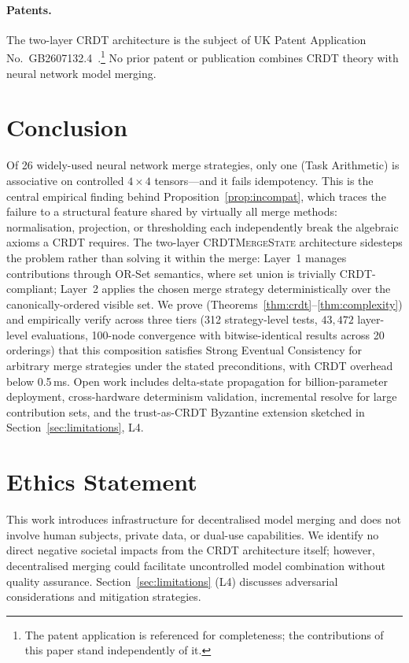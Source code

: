 \documentclass[10pt,letterpaper]{article}
\newcommand{\CMS}{\texorpdfstring{{\mdseries\upshape\textsc{CRDTMergeState}}}{CRDTMergeState}}
\begin{document}
\paragraph{Patents.}
The two-layer CRDT architecture is the subject of UK Patent Application No.\ GB2607132.4~\cite{gillespie2026patent}.\footnote{The patent application is referenced for completeness; the contributions of this paper stand independently of it.}
No prior patent or publication combines CRDT theory with neural network model merging.

\section{Conclusion}

Of 26 widely-used neural network merge strategies, only one (Task Arithmetic) is associative on controlled $4\times 4$ tensors---and it fails idempotency.
This is the central empirical finding behind Proposition~\ref{prop:incompat}, which traces the failure to a structural feature shared by virtually all merge methods: normalisation, projection, or thresholding each independently break the algebraic axioms a CRDT requires.
The two-layer \CMS{} architecture sidesteps the problem rather than solving it within the merge: Layer~1 manages contributions through OR-Set semantics, where set union is trivially CRDT-compliant; Layer~2 applies the chosen merge strategy deterministically over the canonically-ordered visible set.
We prove (Theorems~\ref{thm:crdt}--\ref{thm:complexity}) and empirically verify across three tiers (312 strategy-level tests, $43{,}472$ layer-level evaluations, 100-node convergence with bitwise-identical results across 20 orderings) that this composition satisfies Strong Eventual Consistency for arbitrary merge strategies under the stated preconditions, with CRDT overhead below 0.5\,ms.
Open work includes delta-state propagation for billion-parameter deployment, cross-hardware determinism validation, incremental resolve for large contribution sets, and the trust-as-CRDT Byzantine extension sketched in Section~\ref{sec:limitations}, L4.



\section*{Ethics Statement}

This work introduces infrastructure for decentralised model merging and does not involve human subjects, private data, or dual-use capabilities.
We identify no direct negative societal impacts from the CRDT architecture itself; however, decentralised merging could facilitate uncontrolled model combination without quality assurance.
Section~\ref{sec:limitations} (L4) discusses adversarial considerations and mitigation strategies.
\end{document}
